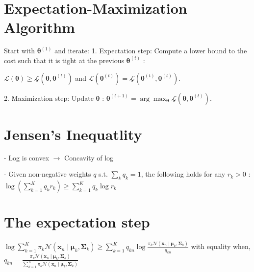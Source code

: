 
\section{Expectation-Maximization Algorithm}



Start with $\boldsymbol{\theta}^{(1)}$ and iterate:
1. Expectation step: Compute a lower bound to the cost such that it is tight at the previous $\boldsymbol{\theta}^{(t)}$ :

$\mathcal{L}(\boldsymbol{\theta}) \geq \underline{\mathcal{L}}\left(\boldsymbol{\theta}, \boldsymbol{\theta}^{(t)}\right)$ and
$\mathcal{L}\left(\boldsymbol{\theta}^{(t)}\right)=\underline{\mathcal{L}}\left(\boldsymbol{\theta}^{(t)}, \boldsymbol{\theta}^{(t)}\right)$.

2. Maximization step: Update $\boldsymbol{\theta}$ :
$
\boldsymbol{\theta}^{(t+1)}=\arg \max _{\boldsymbol{\theta}} \underline{\mathcal{L}}\left(\boldsymbol{\theta}, \boldsymbol{\theta}^{(t)}\right) .
$

\section*{Jensen's Inequatlity}
- Log is convex $\rightarrow$ Concavity of log

- Given non-negative weights $q$ s.t. $\sum_{k} q_{k}=1$, the following holds for any $r_{k}>0$ :
$\log \left(\sum_{k=1}^{K} q_{k} r_{k}\right) \geq \sum_{k=1}^{K} q_{k} \log r_{k}$

\section*{The expectation step}
$\log \sum_{k=1}^{K} \pi_{k} \mathcal{N}\left(\mathbf{x}_{n} \mid \boldsymbol{\mu}_{k}, \boldsymbol{\Sigma}_{k}\right) \geq \sum_{k=1}^{K} q_{k n} \log \frac{\pi_{k} \mathcal{N}\left(\mathbf{x}_{n} \mid \boldsymbol{\mu}_{k}, \boldsymbol{\Sigma}_{k}\right)}{q_{k n}}$
with equality when,
$q_{k n}=\frac{\pi_{k} \mathcal{N}\left(\mathbf{x}_{n} \mid \boldsymbol{\mu}_{k}, \boldsymbol{\Sigma}_{k}\right)}{\sum_{k=1}^{K} \pi_{k} \mathcal{N}\left(\mathbf{x}_{n} \mid \boldsymbol{\mu}_{k}, \boldsymbol{\Sigma}_{k}\right)}$

